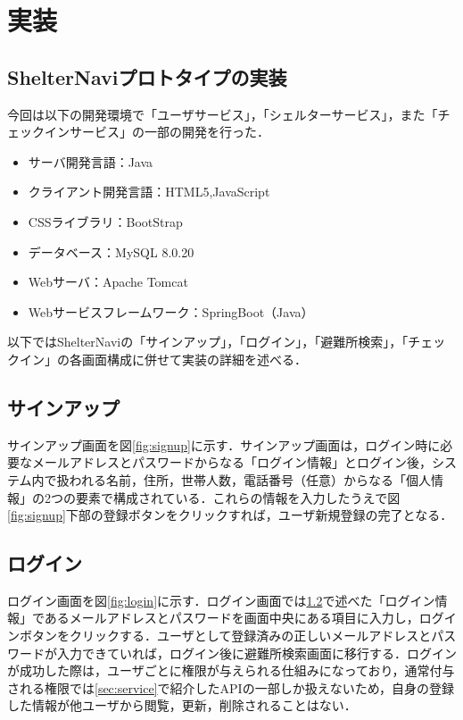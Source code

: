 \documentclass[technicalreport,dvipdfmx]{ieicej}
\begin{document}
\section{実装}
\subsection{ShelterNaviプロトタイプの実装}
今回は以下の開発環境で「ユーザサービス」，「シェルターサービス」，また「チェックインサービス」の一部の開発を行った．
\begin{itemize}
    \item サーバ開発言語：Java
    \item クライアント開発言語：HTML5,JavaScript
    \item CSSライブラリ：BootStrap
    \item データベース：MySQL 8.0.20
    \item Webサーバ：Apache Tomcat
    \item Webサービスフレームワーク：SpringBoot（Java）
\end{itemize}
以下ではShelterNaviの「サインアップ」，「ログイン」，「避難所検索」，「チェックイン」の各画面構成に併せて実装の詳細を述べる．

\subsection{サインアップ}
\label{sec:signup}
サインアップ画面を図\ref{fig:signup}に示す．サインアップ画面は，ログイン時に必要なメールアドレスとパスワードからなる「ログイン情報」とログイン後，システム内で扱われる名前，住所，世帯人数，電話番号（任意）からなる「個人情報」の2つの要素で構成されている．これらの情報を入力したうえで図\ref{fig:signup}下部の登録ボタンをクリックすれば，ユーザ新規登録の完了となる．

\subsection{ログイン}
ログイン画面を図\ref{fig:login}に示す．ログイン画面では\ref{sec:signup}で述べた「ログイン情報」であるメールアドレスとパスワードを画面中央にある項目に入力し，ログインボタンをクリックする．ユーザとして登録済みの正しいメールアドレスとパスワードが入力できていれば，ログイン後に避難所検索画面に移行する．ログインが成功した際は，ユーザごとに権限が与えられる仕組みになっており，通常付与される権限では\ref{sec:service}で紹介したAPIの一部しか扱えないため，自身の登録した情報が他ユーザから閲覧，更新，削除されることはない．
\end{document}
